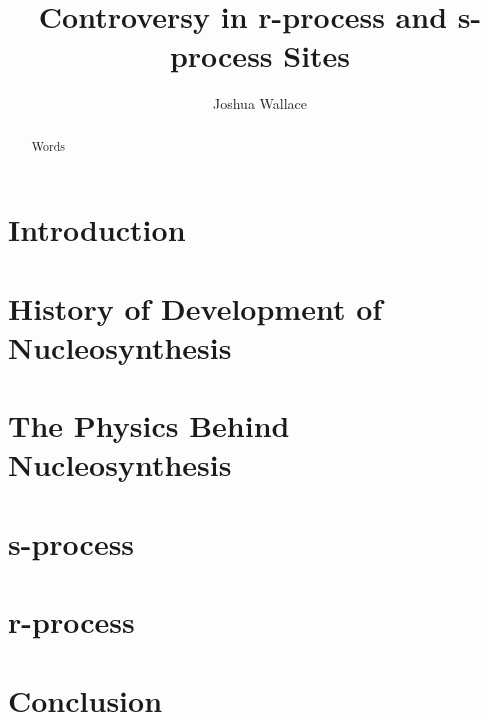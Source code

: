\documentclass{emulateapj}
\begin{document}
\title{Controversy in r-process and s-process Sites}

\author{Joshua Wallace}

\begin{abstract}
Words
\end{abstract}


\section{Introduction}


\section{History of Development of Nucleosynthesis}


\section{The Physics Behind Nucleosynthesis}


\section{s-process}



\section{r-process}



\section{Conclusion}



\end{document}
